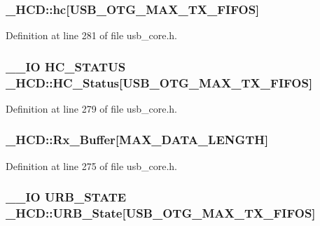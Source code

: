 \hypertarget{struct___h_c_d_aa0dbf880808375467d4cc697b51cea71}{
\subsubsection[{hc}]{ \-\_\-\-H\-C\-D\-::hc\mbox{[}U\-S\-B\-\_\-\-O\-T\-G\-\_\-\-M\-A\-X\-\_\-\-T\-X\-\_\-\-F\-I\-F\-O\-S\mbox{]}}}\label{struct___h_c_d_aa0dbf880808375467d4cc697b51cea71}


Definition at line 281 of file usb\-\_\-core.\-h.

\hypertarget{struct___h_c_d_afff8e4f7048e5b3fa054873aa28ac376}{
\subsubsection[{H\-C\-\_\-\-Status}]{\setlength{\rightskip}{0pt plus 5cm}\-\_\-\-\_\-\-I\-O {\bf H\-C\-\_\-\-S\-T\-A\-T\-U\-S} \-\_\-\-H\-C\-D\-::\-H\-C\-\_\-\-Status\mbox{[}U\-S\-B\-\_\-\-O\-T\-G\-\_\-\-M\-A\-X\-\_\-\-T\-X\-\_\-\-F\-I\-F\-O\-S\mbox{]}}}\label{struct___h_c_d_afff8e4f7048e5b3fa054873aa28ac376}


Definition at line 279 of file usb\-\_\-core.\-h.

\hypertarget{struct___h_c_d_a9b886e4a5ff9ac8e0ab66c36d4fa03b4}{
\subsubsection[{Rx\-\_\-\-Buffer}]{ \-\_\-\-H\-C\-D\-::\-Rx\-\_\-\-Buffer\mbox{[}M\-A\-X\-\_\-\-D\-A\-T\-A\-\_\-\-L\-E\-N\-G\-T\-H\mbox{]}}}\label{struct___h_c_d_a9b886e4a5ff9ac8e0ab66c36d4fa03b4}


Definition at line 275 of file usb\-\_\-core.\-h.

\hypertarget{struct___h_c_d_a6700b3ad3fceafe3fec9008502fe8885}{
\subsubsection[{U\-R\-B\-\_\-\-State}]{\setlength{\rightskip}{0pt plus 5cm}\-\_\-\-\_\-\-I\-O {\bf U\-R\-B\-\_\-\-S\-T\-A\-T\-E} \-\_\-\-H\-C\-D\-::\-U\-R\-B\-\_\-\-State\mbox{[}U\-S\-B\-\_\-\-O\-T\-G\-\_\-\-M\-A\-X\-\_\-\-T\-X\-\_\-\-F\-I\-F\-O\-S\mbox{]}}}\label{struct___h_c_d_a6700b3ad3fceafe3fec9008502fe8885}


